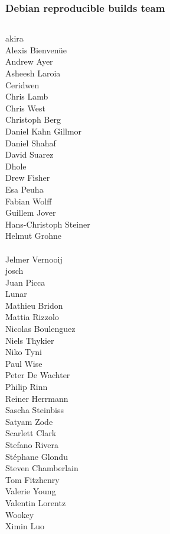 \documentclass[14pt]{beamer}
\begin{document}
\begin{frame}
 \frametitle{Debian reproducible builds team}
 \begin{center}
  \begin{columns}
   \small
    {akira} \\
    {Alexis Bienvenüe} \\
    {Andrew Ayer} \\
    {Asheesh Laroia} \\
    {Ceridwen} \\
    {Chris Lamb} \\
    {Chris West} \\
    {Christoph Berg} \\
    {Daniel Kahn Gillmor} \\
    {Daniel Shahaf} \\
    David Suarez \\
    {Dhole} \\
    Drew Fisher \\
    Esa Peuha \\
    {Fabian Wolff} \\
    {Guillem Jover} \\
    Hans-Christoph Steiner \\
    {Helmut Grohne} \\
     \\
    {Jelmer Vernooij} \\
    {josch} \\
    Juan Picca \\
    {Lunar} \\
    Mathieu Bridon \\
    {Mattia Rizzolo} \\
    Nicolas Boulenguez \\
    {Niels Thykier} \\
    Niko Tyni \\
    {Paul Wise} \\
    Peter De Wachter \\
    Philip Rinn \\
    {Reiner Herrmann} \\
    {Sascha Steinbiss} \\
    {Satyam Zode} \\
    {Scarlett Clark} \\
    {Stefano Rivera} \\
    {Stéphane Glondu} \\
    {Steven Chamberlain} \\
    Tom Fitzhenry \\
    {Valerie Young} \\
    Valentin Lorentz \\
    {Wookey} \\
    {Ximin Luo} \\
  \end{columns}
 \end{center}
\end{frame}
\end{document}
